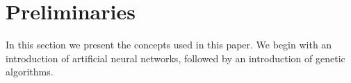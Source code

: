 \section{Preliminaries}
\label{sec:preliminaries}

In this section we present the concepts used in this paper.
We begin with an introduction of artificial neural networks, followed by an introduction of genetic algorithms. 








